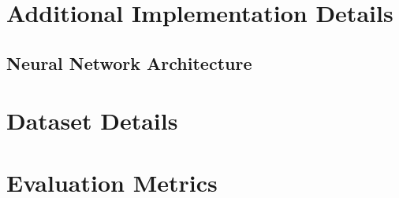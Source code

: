 \clearpage
\appendix
\section{Additional Implementation Details}
\subsection{Neural Network Architecture}
\subsection{}
\section{Dataset Details}
\section{Evaluation Metrics}
